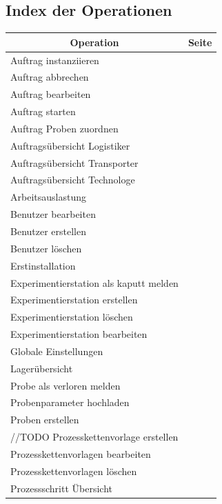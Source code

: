 \documentclass[enabledeprecatedfontcommands,fontsize=12pt,paper=a4,twoside]{scrartcl}
\begin{document}
\subsection{Index der Operationen}
\begin{longtable}[c]{|p{12cm}|p{3cm}|}
\hline
\multicolumn{1}{|c|}{\textbf{Operation}}                          & \multicolumn{1}{c|}{\textbf{Seite}}                                                                                                                                                                                                               \\ \hline
\endhead
Auftrag instanziieren & \\ \hline
Auftrag abbrechen & \\ \hline
Auftrag bearbeiten & \\ \hline
Auftrag starten  & \\ \hline
Auftrag Proben zuordnen & \\ \hline
Auftragsübersicht Logistiker & \\ \hline
Auftragsübersicht Transporter & \\ \hline
Auftragsübersicht Technologe & \\ \hline
Arbeitsauslastung  & \\ \hline
Benutzer bearbeiten & \\ \hline
Benutzer erstellen & \\ \hline
Benutzer löschen & \\ \hline
Erstinstallation & \\ \hline
Experimentierstation als kaputt melden & \\ \hline
Experimentierstation erstellen & \\ \hline
Experimentierstation löschen & \\ \hline
Experimentierstation bearbeiten & \\ \hline
Globale Einstellungen & \\ \hline
Lagerübersicht & \\ \hline
Probe als verloren melden & \\ \hline
Probenparameter hochladen  & \\ \hline
Proben erstellen  & \\ \hline //TODO
Prozesskettenvorlage erstellen & \\ \hline
Prozesskettenvorlagen bearbeiten & \\ \hline
Prozesskettenvorlagen löschen & \\ \hline
Prozessschritt Übersicht & \\ \hline

\end{longtable}
\end{document}

